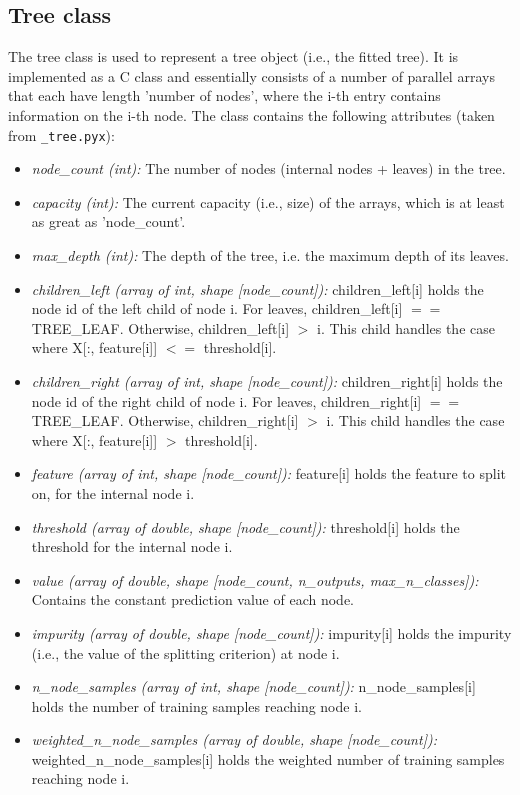 \documentclass[11pt, a4paper]{article}
\begin{document}
\subsection{Tree class}
The tree class is used to represent a tree object (i.e., the fitted
tree). It is implemented as a C class and essentially consists of a
number of parallel arrays that each have length 'number of nodes',
where the i-th entry contains information on the i-th node. The class
contains the following attributes (taken from \texttt{\_tree.pyx}):
\begin{itemize}
\item \textit{node\_count (int):} The number of nodes (internal nodes
  + leaves) in the tree.
\item \textit{capacity (int):} The current capacity (i.e., size) of
  the arrays, which is at least as great as 'node\_count'.
\item \textit{max\_depth (int):} The depth of the tree, i.e. the
  maximum depth of its leaves.
\item \textit{children\_left (array of int, shape [node\_count]):}
  children\_left[i] holds the node id of the left child of node i.
  For leaves, children\_left[i] $==$ TREE\_LEAF. Otherwise,
  children\_left[i] $>$ i. This child handles the case where X[:,
  feature[i]] $<=$ threshold[i].
\item \textit{children\_right (array of int, shape [node\_count]):}
  children\_right[i] holds the node id of the right child of node i.
  For leaves, children\_right[i] $==$ TREE\_LEAF. Otherwise,
  children\_right[i] $>$ i. This child handles the case where X[:,
  feature[i]] $>$ threshold[i].
\item \textit{feature (array of int, shape [node\_count]):} feature[i]
  holds the feature to split on, for the internal node i.
\item \textit{threshold (array of double, shape [node\_count]):}
  threshold[i] holds the threshold for the internal node i.
\item \textit{value (array of double, shape [node\_count, n\_outputs,
    max\_n\_classes]):} Contains the constant prediction value of each
  node.
\item \textit{impurity (array of double, shape [node\_count]):}
  impurity[i] holds the impurity (i.e., the value of the splitting
  criterion) at node i.
\item \textit{n\_node\_samples (array of int, shape [node\_count]):}
  n\_node\_samples[i] holds the number of training samples reaching node
  i.
\item \textit{weighted\_n\_node\_samples (array of double, shape
    [node\_count]):} weighted\_n\_node\_samples[i] holds the weighted
  number of training samples reaching node i.
\end{itemize}
\end{document}
